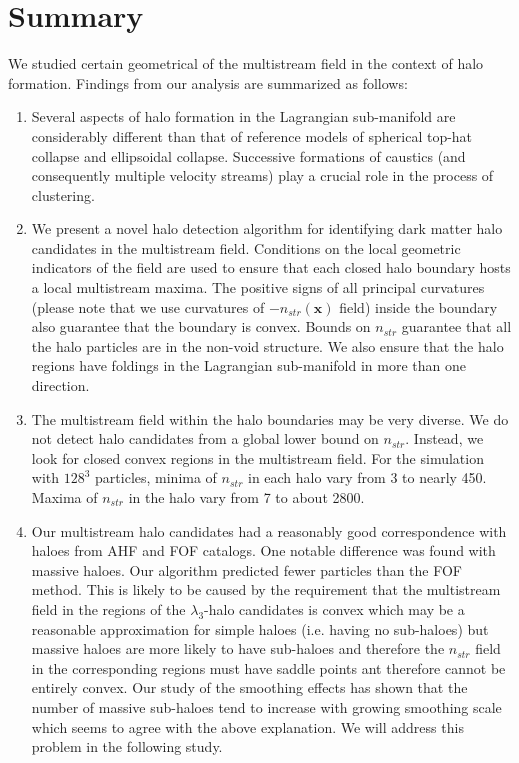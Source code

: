 \section{Summary}
\label{sec:5summary}

We studied certain geometrical of the multistream field in the context of halo formation. Findings from our analysis are summarized as follows: 

\begin{enumerate}

\item Several aspects of halo formation in the Lagrangian sub-manifold are considerably different than that of reference models of spherical top-hat collapse and ellipsoidal collapse. Successive formations of caustics (and consequently multiple velocity streams) play a crucial role in the process of clustering.

\item We present a novel halo detection algorithm for identifying dark matter halo candidates in the multistream field. Conditions on the local geometric indicators of the field are used to ensure that each closed halo boundary hosts a local multistream maxima. The 
positive signs of all principal curvatures  (please note that we use curvatures of $-n_{str}(\mathbf{x})$ field) inside the boundary also guarantee that the boundary is convex. 
Bounds on $n_{str}$  guarantee that all the halo particles are in the non-void structure. We also ensure that the halo regions have foldings in the Lagrangian sub-manifold in more than one direction.  

\item The multistream field within the halo boundaries may be very diverse. We do not detect halo candidates from a global lower bound on $n_{str}$. Instead, we look for closed convex regions in the multistream field. For the simulation with $128^3$ particles, minima of $n_{str}$ in each halo vary from 3 to nearly 450. Maxima of $n_{str}$ in the halo vary from 7 to about 2800. 

\item Our multistream halo candidates had a reasonably good correspondence with haloes from AHF and FOF catalogs. One notable difference was found with massive haloes. Our algorithm predicted fewer particles than the FOF method. This is likely to be caused
by the requirement that the multistream field in the regions of the $\lambda_3$-halo candidates is convex  which may be a reasonable approximation  for simple haloes (i.e. having no sub-haloes) but massive haloes are more likely to have sub-haloes and therefore the $n_{str}$ field in the corresponding regions must have saddle points ant therefore cannot be entirely convex. Our study of the smoothing effects  has shown that the number of massive sub-haloes tend to increase with growing smoothing scale which seems to agree with the above explanation. We will address this problem in the following study.
  


\end{enumerate}
